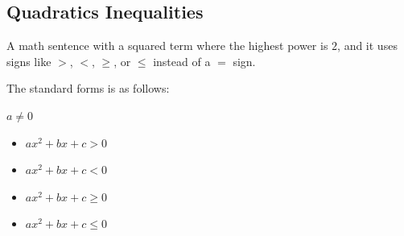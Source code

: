\subsection{Quadratics Inequalities}
\begin{definition}
  A math sentence with a squared term where the highest power is $2$, and it uses signs like $>$, $<$, $\ge$, or $\le$ instead of a $=$ sign.

  
  The standard forms is as follows:


  $a \ne 0$
  \begin{itemize}
  \item $ax^2 + bx + c > 0$
  \item $ax^2 + bx + c < 0$
  \item $ax^2 + bx + c \ge 0$
  \item $ax^2 + bx + c \le 0$
  \end{itemize}
\end{definition}

